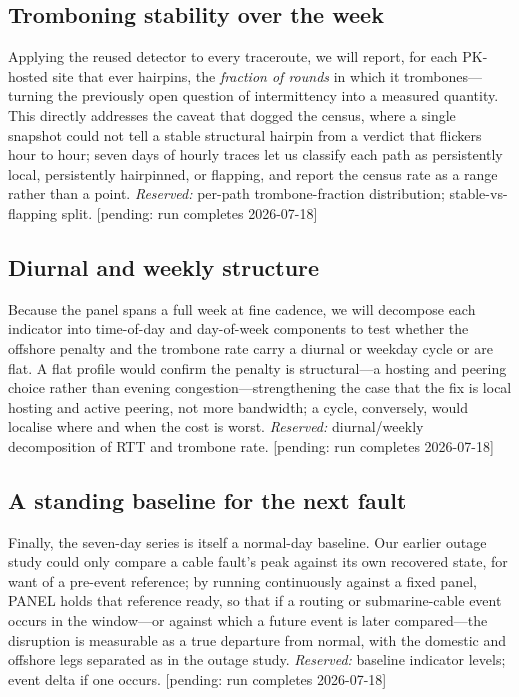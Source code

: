 \documentclass[conference]{IEEEtran}
\newcommand{\pending}{{\color{gray}\small[pending: run completes 2026-07-18]}}
\begin{document}
\subsection{Tromboning stability over the week}
Applying the reused detector to every traceroute, we will report, for each PK-hosted site that ever
hairpins, the \emph{fraction of rounds} in which it trombones---turning the previously open question
of intermittency into a measured quantity. This directly addresses the caveat that dogged the census,
where a single snapshot could not tell a stable structural hairpin from a verdict that flickers hour
to hour; seven days of hourly traces let us classify each path as persistently local, persistently
hairpinned, or flapping, and report the census rate as a range rather than a point.
\emph{Reserved:} per-path trombone-fraction distribution; stable-vs-flapping split. \pending

\subsection{Diurnal and weekly structure}
Because the panel spans a full week at fine cadence, we will decompose each indicator into
time-of-day and day-of-week components to test whether the offshore penalty and the trombone rate
carry a diurnal or weekday cycle or are flat. A flat profile would confirm the penalty is
structural---a hosting and peering choice rather than evening congestion---strengthening the case
that the fix is local hosting and active peering, not more bandwidth; a cycle, conversely, would
localise where and when the cost is worst.
\emph{Reserved:} diurnal/weekly decomposition of RTT and trombone rate. \pending

\subsection{A standing baseline for the next fault}
Finally, the seven-day series is itself a normal-day baseline. Our earlier outage study could only
compare a cable fault's peak against its own recovered state, for want of a pre-event reference; by
running continuously against a fixed panel, PANEL holds that reference ready, so that if a routing or
submarine-cable event occurs in the window---or against which a future event is later compared---the
disruption is measurable as a true departure from normal, with the domestic and offshore legs
separated as in the outage study.
\emph{Reserved:} baseline indicator levels; event delta if one occurs. \pending
\end{document}
